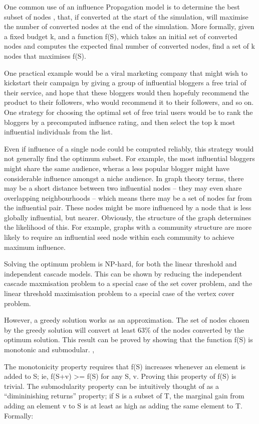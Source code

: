 One common use of an influence Propagation model is to determine the best subset of nodes \cite{kempe}, that, if converted at the start of the simulation, will maximise the number of converted nodes at the end of the simulation. More formally, given a fixed budget k, and a function f(S), which takes an initial set of converted nodes and computes the expected final number of converted nodes, find a set of k nodes that maximises f(S).

One practical example would be a viral marketing company that might wish to kickstart their campaign by giving a group of influential bloggers a free trial of their service, and hope that these bloggers would then hopefuly recommend the product to their followers, who would recommend it to their followers, and so on. One strategy for choosing the optimal set of free trial users would be to rank the bloggers by a precomputed influence rating, and then select the top k most influential individuals from the list.

Even if influence of a single node could be computed reliably, this strategy would not generally find the optimum subset. For example, the most influential bloggers might share the same audience, wheras a less popular blogger might have considerable influence amongst a niche audience. In graph theory terms, there may be a short distance between two influential nodes -- they may even share overlapping neighbourhoods -- which means there may be a set of nodes far from the influential pair. These nodes might be more influenced by a node that is less globally influential, but nearer. Obviously, the structure of the graph determines the likelihood of this. For example, graphs with a community structure are more likely to require an influential seed node within each community to achieve maximum influence.

Solving the optimum problem is NP-hard, for both the linear threshold and independent cascade models. This can be shown by reducing the independent cascade maxmisation problem to a special case of the set cover problem, and the linear threshold maximisation problem to a special case of the vertex cover problem.

However, a greedy solution works as an approximation. The set of nodes chosen by the greedy solution will convert at least 63\% of the nodes converted by the optimum solution. This result can be proved by showing that the function f(S) is monotonic and submodular. \cite{mossel}, \cite{kempe}

The monotonicity property requires that f(S) increases whenever an element is added to S; ie, f(S+v) >= f(S) for any S, v. Proving this property of f(S) is trivial. The submodularity property can be intuitively thought of as a ``dimininishing returns'' property; if S is a subset of T, the marginal gain from adding an element v to S is at least as high as adding the same element to T. Formally:

